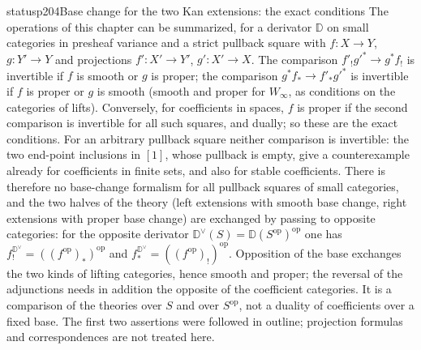 \begin{dcomment}{status}{p204}{Base change for the two Kan extensions: the exact conditions}
The operations of this chapter can be summarized, for a derivator $\mathbb D$ on small categories in presheaf variance and a strict pullback square with $f:X\to Y$, $g:Y'\to Y$ and projections $f':X'\to Y'$, $g':X'\to X$. The comparison $f'_!g'^*\to g^*f_!$ is invertible if $f$ is smooth or $g$ is proper; the comparison $g^*f_*\to f'_*g'^*$ is invertible if $f$ is proper or $g$ is smooth (smooth and proper for $W_\infty$, as conditions on the categories of lifts). Conversely, for coefficients in spaces, $f$ is proper if the second comparison is invertible for all such squares, and dually; so these are the exact conditions. For an arbitrary pullback square neither comparison is invertible: the two end-point inclusions in $[1]$, whose pullback is empty, give a counterexample already for coefficients in finite sets, and also for stable coefficients. There is therefore no base-change formalism for all pullback squares of small categories, and the two halves of the theory (left extensions with smooth base change, right extensions with proper base change) are exchanged by passing to opposite categories: for the opposite derivator $\mathbb D^\vee(S)=\mathbb D(S^{\mathrm{op}})^{\mathrm{op}}$ one has $f_!^{\mathbb D^\vee}=((f^{\mathrm{op}})_*)^{\mathrm{op}}$ and $f_*^{\mathbb D^\vee}=((f^{\mathrm{op}})_!)^{\mathrm{op}}$. Opposition of the base exchanges the two kinds of lifting categories, hence smooth and proper; the reversal of the adjunctions needs in addition the opposite of the coefficient categories. It is a comparison of the theories over $S$ and over $S^{\mathrm{op}}$, not a duality of coefficients over a fixed base. The first two assertions were followed in outline; projection formulas and correspondences are not treated here.
\end{dcomment}
